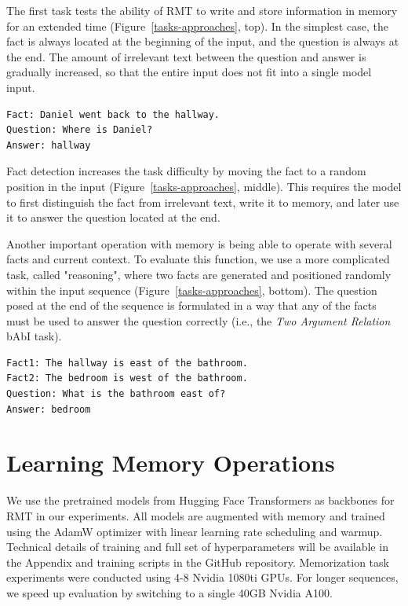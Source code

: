 The first task tests the ability of RMT to write and store information in memory for an extended time (Figure~\ref{tasks-approaches}, top). In the simplest case, the fact is always located at the beginning of the input, and the question is always at the end. The amount of irrelevant text between the question and answer is gradually increased, so that the entire input does not fit into a single model input.

\begin{verbatim}
Fact: Daniel went back to the hallway.
Question: Where is Daniel?
Answer: hallway
\end{verbatim}

Fact detection increases the task difficulty by moving the fact to a random position in the input (Figure~\ref{tasks-approaches}, middle). This requires the model to first distinguish the fact from irrelevant text, write it to memory, and later use it to answer the question located at the end.

Another important operation with memory is being able to operate with several facts and current context. To evaluate this function, we use a more complicated task, called "reasoning",
where two facts are generated and positioned randomly within the input sequence (Figure~\ref{tasks-approaches}, bottom). The question posed at the end of the sequence is formulated in a way that any of the facts must be used to answer the question correctly (i.e., the \textit{Two Argument Relation} bAbI task).

\begin{verbatim}
Fact1: The hallway is east of the bathroom.
Fact2: The bedroom is west of the bathroom.
Question: What is the bathroom east of?
Answer: bedroom
\end{verbatim}

\section{Learning Memory Operations}

We use the pretrained models from Hugging Face Transformers \citep{wolf2020transformers} as backbones for RMT in our experiments. All models are augmented with memory and trained using the AdamW optimizer \citep{loshchilov2018adamw} with linear learning rate scheduling and warmup. Technical details of training and full set of hyperparameters will be available in the Appendix and training scripts in the GitHub repository.%
Memorization task experiments were conducted using 4-8 Nvidia 1080ti GPUs. For longer sequences, we speed up evaluation by switching to a single 40GB Nvidia A100. 


